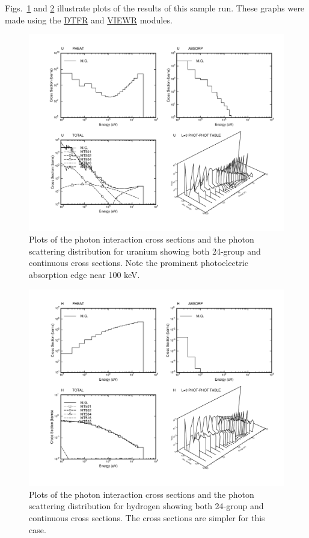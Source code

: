 Figs.~\ref{fig2} and \ref{fig3} illustrate plots of the results of this
sample run.  These graphs were made using the
\hyperlink{sDTFRhy}{DTFR} and \hyperlink{sVIEWRhy}{VIEWR} modules.

\begin{figure}[p]\centering
\includegraphics[keepaspectratio, width=4.5in, angle=0]{figs/gaminr2ack}
\caption[Photon interaction cross sections for uranium]{Plots of the photon
 interaction cross sections and the photon scattering distribution for uranium
 showing both 24-group and continuous cross sections.  Note the prominent
 photoelectric absorption edge near 100 keV.}
\label{fig2}
\end{figure}

\begin{figure}[p]\centering
\includegraphics[keepaspectratio, width=4.5in, angle=0]{figs/gaminr3ack}
\caption[Photon interaction cross sections for hydrogen]{Plots of the photon
 interaction cross sections and the photon scattering distribution for hydrogen
 showing both 24-group and continuous cross sections.  The cross sections
 are simpler for this case.}
\label{fig3}
\end{figure}

